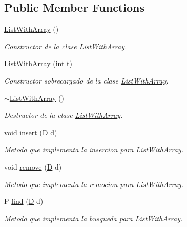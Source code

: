 \subsection*{Public Member Functions}
\begin{DoxyCompactItemize}
\item 
\hyperlink{class_list_with_array_a06f0e8035e9cc43aff4d32c46a00fcf0}{List\+With\+Array} ()
\begin{DoxyCompactList}\small\item\em Constructor de la clase \hyperlink{class_list_with_array}{List\+With\+Array}. \end{DoxyCompactList}\item 
\hyperlink{class_list_with_array_a3a6d11f203fb0f7e458672e85db26b03}{List\+With\+Array} (int t)
\begin{DoxyCompactList}\small\item\em Constructor sobrecargado de la clase \hyperlink{class_list_with_array}{List\+With\+Array}. \end{DoxyCompactList}\item 
\hyperlink{class_list_with_array_a1886482555430b0f3eb5ebe02cbb0c87}{$\sim$\+List\+With\+Array} ()
\begin{DoxyCompactList}\small\item\em Destructor de la clase \hyperlink{class_list_with_array}{List\+With\+Array}. \end{DoxyCompactList}\item 
void \hyperlink{class_list_with_array_afa0b6d215c2cc1d3fe6b9b48d6b6917d}{insert} (\hyperlink{main_8cpp_af316c33cc298530f245e8b55330e86b5}{D} d)
\begin{DoxyCompactList}\small\item\em Metodo que implementa la insercion para \hyperlink{class_list_with_array}{List\+With\+Array}. \end{DoxyCompactList}\item 
void \hyperlink{class_list_with_array_aaa18e76fc128ca05151178d914901ec3}{remove} (\hyperlink{main_8cpp_af316c33cc298530f245e8b55330e86b5}{D} d)
\begin{DoxyCompactList}\small\item\em Metodo que implementa la remocion para \hyperlink{class_list_with_array}{List\+With\+Array}. \end{DoxyCompactList}\item 
P \hyperlink{class_list_with_array_a9a054a6d407dc5cb39575739fe412fff}{find} (\hyperlink{main_8cpp_af316c33cc298530f245e8b55330e86b5}{D} d)
\begin{DoxyCompactList}\small\item\em Metodo que implementa la busqueda para \hyperlink{class_list_with_array}{List\+With\+Array}. \end{DoxyCompactList}\item 

\end{DoxyCompactItemize}
